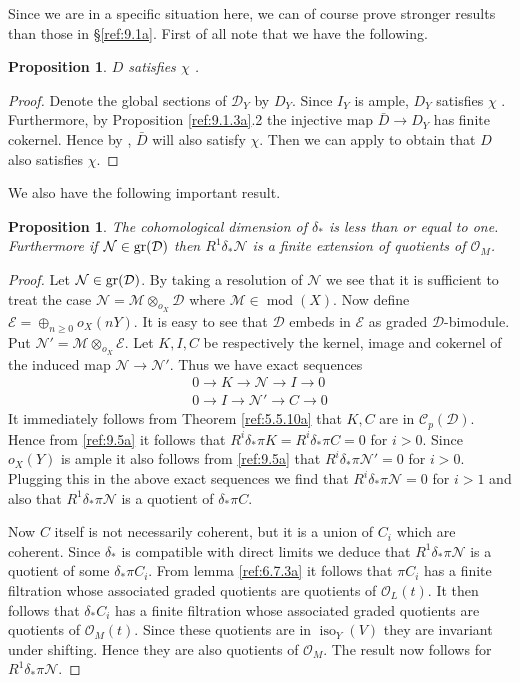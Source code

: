 \documentclass{amsproc}
\def\Cscr{{\mathcal C}}
\def\Dscr{{\mathcal D}}
\def\Escr{{\mathcal E}}
\def\Mscr{{\mathcal M}}
\def\Nscr{{\mathcal N}}
\def\Oscr{{\mathcal O}}
\def\gr{\mathop{\text{gr}}}
\def\iso{\operatorname{iso}}
\def\gr{\operatorname {gr}}
\def\coh{\operatorname {mod}}
\def\gr{\operatorname {gr}}
\def\r{\rightarrow}
\let\oldtext\text
\def\text#1{\oldtext{\upshape #1}}
\newtheorem{propositions}[lemmas]{Proposition}
\theoremstyle{definition}
\theoremstyle{remark}
\numberwithin{equation}{section}
\numberwithin{table}{section}
\numberwithin{figure}{section}
\def\gr{\mathop{\text{gr}}}
\begin{document}
Since we are in a specific situation here, we can of course prove
stronger results than those in \S\ref{ref:9.1a}. First of all note that we
have the following.
\begin{propositions}
\label{ref:9.2.1a}
$D$ satisfies $\chi$ \cite[Def. 3.7]{AZ}.
\end{propositions}
\begin{proof}
Denote the global sections of $\Dscr_Y$ by $D_Y$.
Since $I_{Y}$ is ample, $D_Y$ satisfies $\chi$
\cite{AZ}. Furthermore, by 
Proposition \ref{ref:9.1.3a}.2 the injective map $\bar{D}\r D_Y$ has finite
cokernel. Hence by \cite[Lemma 8.2]{AZ}, $\bar{D}$ will also satisfy
$\chi$. Then we can apply \cite[Thm 8.8]{AZ} to obtain that $D$ also
satisfies $\chi$.
\end{proof}
We also have the following important result.
\begin{propositions}
\label{ref:9.2.2a}
The cohomological dimension of $\delta_\ast$ is less than or equal to
one. Furthermore if $\Nscr\in\gr (\Dscr)$ then $R^1\delta_\ast\Nscr$ is a
finite extension of  quotients of $\Oscr_M$.
\end{propositions}
\begin{proof}
  Let $\Nscr\in \gr(\Dscr)$. By taking a resolution of $\Nscr$ we see
  that it is sufficient to treat the case $\Nscr=\Mscr\otimes_{o_X}
  \Dscr$ where $\Mscr\in\coh(X)$. Now define $\Escr=\oplus_{n\ge 0}
  o_X(nY)$. It is easy to see that $\Dscr$ embeds in $\Escr$ as graded
  $\Dscr$-bimodule. Put $\Nscr'=\Mscr\otimes_{o_X} \Escr$. Let $K,I,C$
  be respectively the kernel, image and cokernel of the induced map
  $\Nscr\r \Nscr'$. Thus we have exact sequences
\begin{gather*}
0\r K \r \Nscr\r I\r 0\\
0\r I\r \Nscr'\r C\r 0
\end{gather*}
It immediately follows from Theorem \ref{ref:5.5.10a}
that $K,C$ are in $\Cscr_p(\Dscr)$. Hence from \eqref{ref:9.5a} it
follows that $R^i\delta_\ast \pi K= R^i\delta_\ast \pi C=0$ for $i>0$.
Since $o_X(Y)$ is ample it  also follows from \eqref{ref:9.5a} that
$R^i\delta_\ast\pi\Nscr'=0$ for $i>0$. Plugging this in the above exact
sequences we find that $R^i\delta_\ast\pi\Nscr=0$ for $i>1$ and also
that $R^1\delta_\ast \pi\Nscr$ is a quotient of $\delta_\ast \pi C$.

Now $C$ itself is not necessarily coherent, but it is a union of $C_i$
which are coherent. Since $\delta_\ast$ is compatible with direct
limits we deduce that $R^1\delta_\ast \pi\Nscr$ is a quotient of some
$\delta_\ast \pi C_i$. From lemma \ref{ref:6.7.3a} it follows that
$\pi C_i$ has a finite filtration whose associated graded quotients
are quotients of $\Oscr_L(t)$. It then follows that $\delta_\ast C_i$ has
a finite filtration whose associated graded quotients are quotients of
$\Oscr_M(t)$. Since these quotients are in $\iso_Y(V)$ they are
invariant under shifting. Hence they are also quotients of $\Oscr_M$.
The result now follows for $R^1\delta_\ast \pi\Nscr$.
\end{proof}
\end{document}
